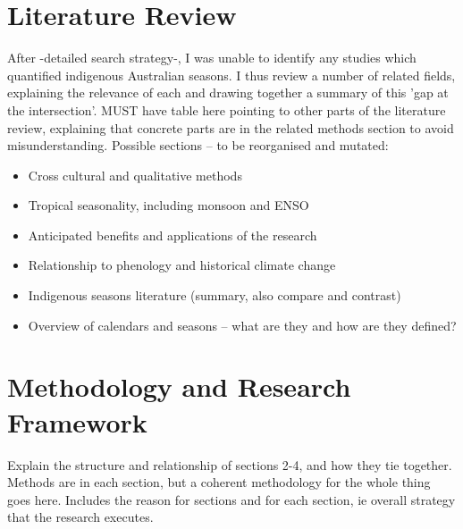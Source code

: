 \section{Literature Review}
After -detailed search strategy-, I was unable to identify any studies which quantified indigenous Australian seasons.
I thus review a number of related fields, explaining the relevance of each and drawing together a summary of this 'gap at the intersection'.
MUST have table here pointing to other parts of the literature review, explaining that concrete parts are in the related methods section to avoid misunderstanding. 
Possible sections – to be reorganised and mutated:

\begin{itemize}
\item Cross cultural and qualitative methods
\item Tropical seasonality, including monsoon and ENSO
\item Anticipated benefits and applications of the research
\item Relationship to phenology and historical climate change
\item Indigenous seasons literature (summary, also compare and contrast)
\item Overview of calendars and seasons – what are they and how are they defined?
\end{itemize}

\section{Methodology and Research Framework}
Explain the structure and relationship of sections 2-4, and how they tie together.  Methods are in each section, but a coherent methodology for the whole thing goes here.  Includes the reason for sections and for each section, ie overall strategy that the research executes.

